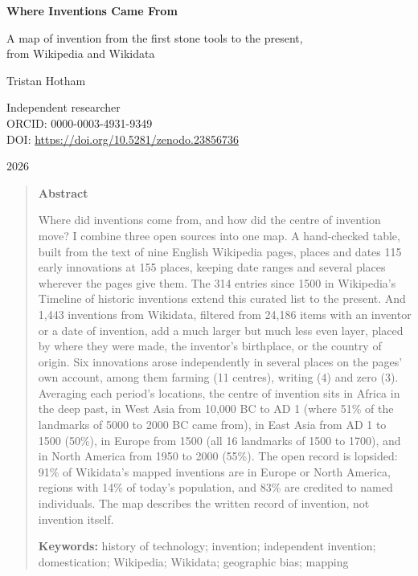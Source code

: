 \documentclass[11pt,a4paper]{article}
\begin{document}
\begin{center}
{\Large\bfseries Where Inventions Came From\par}
\vspace{0.4em}
{\large A map of invention from the first stone tools to the present,\\from Wikipedia and Wikidata\par}
\vspace{1.2em}
{\large Tristan Hotham\par}
\vspace{0.3em}
{\small Independent researcher\\
ORCID: 0000-0003-4931-9349\\
DOI: \href{https://doi.org/10.5281/zenodo.23856736}{https://doi.org/10.5281/zenodo.23856736}\par}
\vspace{0.8em}
2026
\end{center}

\begin{quote}
\small
\begin{center}\textbf{Abstract}\end{center}
Where did inventions come from, and how did the centre of invention move? I combine three open sources into one map. A hand-checked table, built from the text of nine English Wikipedia pages, places and dates 115 early innovations at 155 places, keeping date ranges and several places wherever the pages give them. The 314 entries since 1500 in Wikipedia's Timeline of historic inventions extend this curated list to the present. And 1,443 inventions from Wikidata, filtered from 24,186 items with an inventor or a date of invention, add a much larger but much less even layer, placed by where they were made, the inventor's birthplace, or the country of origin. Six innovations arose independently in several places on the pages' own account, among them farming (11 centres), writing (4) and zero (3). Averaging each period's locations, the centre of invention sits in Africa in the deep past, in West Asia from 10,000 BC to AD 1 (where 51\% of the landmarks of 5000 to 2000 BC came from), in East Asia from AD 1 to 1500 (50\%), in Europe from 1500 (all 16 landmarks of 1500 to 1700), and in North America from 1950 to 2000 (55\%). The open record is lopsided: 91\% of Wikidata's mapped inventions are in Europe or North America, regions with 14\% of today's population, and 83\% are credited to named individuals. The map describes the written record of invention, not invention itself.

\textbf{Keywords:} history of technology; invention; independent invention; domestication; Wikipedia; Wikidata; geographic bias; mapping
\end{quote}
\end{document}
